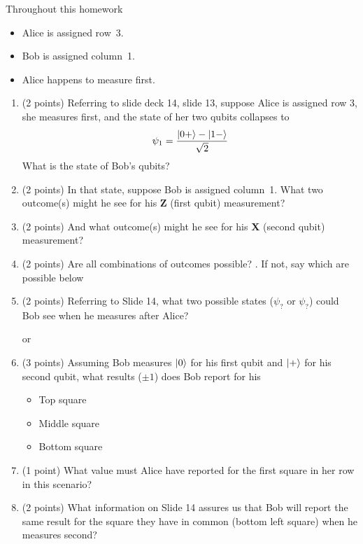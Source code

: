 \documentclass[12pt]{article}
\begin{document}
Throughout this homework
\begin{itemize}
    \item Alice is assigned row~3.
    \item Bob is assigned column~1.  
    \item Alice happens to measure first.
    \end{itemize}
\begin{enumerate}[font=\bfseries]
    \item (2 points) Referring to slide deck 14, slide 13, suppose Alice is assigned row 3, she measures first, and the state of her two qubits collapses to \[ \psi_{1}=\frac{\ket{0+}-\ket{1-}}{\sqrt{2}} \]
    What is the state of Bob's qubits? \Blank[2in]
    \clearpage
    \item (2 points) In that state, suppose Bob is assigned column~1.  What two outcome(s) might he see for his \textbf{Z} (first qubit) measurement?
    
    \Blank[2in]
    \item (2 points) And what outcome(s) might he see for his \textbf{X} (second qubit) measurement?
    
    \Blank[2in]
    
    \item (2 points) Are all combinations of outcomes possible?  \Blank{}.  If not, say which are possible below
    
    \Blank[2in]{}
    \item (2 points) Referring to Slide 14, what two possible states ($\psi_{?}$ or $\psi_{?}$) could Bob see when he measures after Alice?
    
    \Blank{} or \Blank{}
    \item (3 points) Assuming Bob measures $\ket{0}$ for his first qubit and $\ket{+}$ for his second qubit, what results ($\pm 1$) does Bob report for his
    \begin{itemize}
        \item Top square \Blank{}
        \item Middle square \Blank{}
        \item Bottom square \Blank{}
    \end{itemize}
    \item (1 point) What value must Alice have reported for the first square in her row in this scenario? \Blank{}
    \clearpage
    \item (2 points) What information on Slide 14 assures us that Bob will report the same result for the square they have in common (bottom left square) when he measures second?
    
\end{enumerate}
\end{document}
